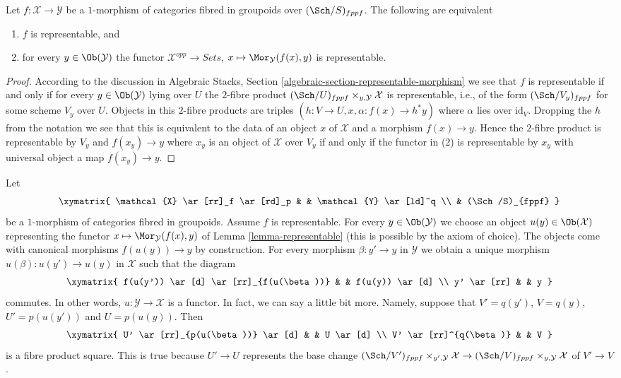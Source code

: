 \begin{lemma}
\label{lemma-representable}
Let $f : \mathcal{X} \to \mathcal{Y}$ be a $1$-morphism of categories
fibred in groupoids over $(\Sch/S)_{fppf}$. The following are
equivalent
\begin{enumerate}
\item $f$ is representable, and
\item for every $y \in \Ob(\mathcal{Y})$ the functor
$\mathcal{X}^{opp} \to \textit{Sets}$,
$x \mapsto \Mor_\mathcal{Y}(f(x), y)$
is representable.
\end{enumerate}
\end{lemma}

\begin{proof}
According to the discussion in
Algebraic Stacks, Section \ref{algebraic-section-representable-morphism}
we see that $f$ is representable if and only if
for every $y \in \Ob(\mathcal{Y})$
lying over $U$ the $2$-fibre product
$(\Sch/U)_{fppf} \times_{y, \mathcal{Y}} \mathcal{X}$
is representable, i.e., of the form $(\Sch/V_y)_{fppf}$ for some
scheme $V_y$ over $U$. Objects in this $2$-fibre products are triples
$(h : V \to U, x, \alpha : f(x) \to h^*y)$ where $\alpha$ lies
over $\text{id}_V$. Dropping the $h$ from the notation we see that this
is equivalent to the data of an object $x$ of $\mathcal{X}$ and a
morphism $f(x) \to y$. Hence the $2$-fibre product is
representable by $V_y$ and $f(x_y) \to y$ where $x_y$ is an object
of $\mathcal{X}$ over $V_y$ if and only if the functor in (2) is representable
by $x_y$ with universal object a map $f(x_y) \to y$.
\end{proof}

\noindent
Let
$$
\xymatrix{
\mathcal{X} \ar[rr]_f \ar[rd]_p & &  \mathcal{Y} \ar[ld]^q \\
& (\Sch/S)_{fppf}
}
$$
be a $1$-morphism of categories fibred in groupoids. Assume $f$ is
representable. For every $y \in \Ob(\mathcal{Y})$ we choose
an object $u(y) \in \Ob(\mathcal{X})$ representing the functor
$x \mapsto \Mor_\mathcal{Y}(f(x), y)$ of
Lemma \ref{lemma-representable}
(this is possible by the axiom of choice).
The objects come with canonical morphisms $f(u(y)) \to y$ by
construction.
For every morphism $\beta : y' \to y$ in $\mathcal{Y}$ we obtain a unique
morphism $u(\beta) : u(y') \to u(y)$ in $\mathcal{X}$ such that the diagram
$$
\xymatrix{
f(u(y')) \ar[d] \ar[rr]_{f(u(\beta))} & & f(u(y)) \ar[d] \\
y' \ar[rr] & & y
}
$$
commutes. In other words, $u : \mathcal{Y} \to \mathcal{X}$ is a functor.
In fact, we can say a little bit more. Namely, suppose that
$V' = q(y')$, $V = q(y)$, $U' = p(u(y'))$ and $U = p(u(y))$. Then
$$
\xymatrix{
U' \ar[rr]_{p(u(\beta))} \ar[d] & & U \ar[d] \\
V' \ar[rr]^{q(\beta)} & & V
}
$$
is a fibre product square. This is true because $U' \to U$ represents
the base change
$(\Sch/V')_{fppf} \times_{y', \mathcal{Y}} \mathcal{X} \to
(\Sch/V)_{fppf} \times_{y, \mathcal{Y}} \mathcal{X}$
of $V' \to V$.

